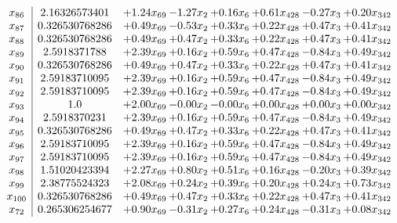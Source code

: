 \documentclass[8pt]{article}
\begin{document}
\[\begin{array}{c| c c@{\hskip 2pt} c@{\hskip 2pt} c@{\hskip 2pt} c@{\hskip 2pt} c@{\hskip 2pt} c@{\hskip 2pt} }
 x_{86}   &  2.16326573401 & +  1.24 x_{69} & -1.27 x_{2} & +  0.16 x_{6} & +  0.61 x_{428} & -0.27 x_{3} & +  0.20 x_{342}\\
 x_{87}   &  0.326530768286 & +  0.49 x_{69} & -0.53 x_{2} & +  0.33 x_{6} & +  0.22 x_{428} & +  0.47 x_{3} & +  0.41 x_{342}\\
 x_{88}   &  0.326530768286 & +  0.49 x_{69} & +  0.47 x_{2} & +  0.33 x_{6} & +  0.22 x_{428} & +  0.47 x_{3} & +  0.41 x_{342}\\
 x_{89}   &  2.5918371788 & +  2.39 x_{69} & +  0.16 x_{2} & +  0.59 x_{6} & +  0.47 x_{428} & -0.84 x_{3} & +  0.49 x_{342}\\
 x_{90}   &  0.326530768286 & +  0.49 x_{69} & +  0.47 x_{2} & +  0.33 x_{6} & +  0.22 x_{428} & +  0.47 x_{3} & +  0.41 x_{342}\\
 x_{91}   &  2.59183710095 & +  2.39 x_{69} & +  0.16 x_{2} & +  0.59 x_{6} & +  0.47 x_{428} & -0.84 x_{3} & +  0.49 x_{342}\\
 x_{92}   &  2.59183710095 & +  2.39 x_{69} & +  0.16 x_{2} & +  0.59 x_{6} & +  0.47 x_{428} & -0.84 x_{3} & +  0.49 x_{342}\\
 x_{93}   &  1.0 & +  2.00 x_{69} & -0.00 x_{2} & -0.00 x_{6} & +  0.00 x_{428} & +  0.00 x_{3} & +  0.00 x_{342}\\
 x_{94}   &  2.5918370231 & +  2.39 x_{69} & +  0.16 x_{2} & +  0.59 x_{6} & +  0.47 x_{428} & -0.84 x_{3} & +  0.49 x_{342}\\
 x_{95}   &  0.326530768286 & +  0.49 x_{69} & +  0.47 x_{2} & +  0.33 x_{6} & +  0.22 x_{428} & +  0.47 x_{3} & +  0.41 x_{342}\\
 x_{96}   &  2.59183710095 & +  2.39 x_{69} & +  0.16 x_{2} & +  0.59 x_{6} & +  0.47 x_{428} & -0.84 x_{3} & +  0.49 x_{342}\\
 x_{97}   &  2.59183710095 & +  2.39 x_{69} & +  0.16 x_{2} & +  0.59 x_{6} & +  0.47 x_{428} & -0.84 x_{3} & +  0.49 x_{342}\\
 x_{98}   &  1.51020423394 & +  2.27 x_{69} & +  0.80 x_{2} & +  0.51 x_{6} & +  0.16 x_{428} & -0.20 x_{3} & +  0.39 x_{342}\\
 x_{99}   &  2.38775524323 & +  2.08 x_{69} & +  0.24 x_{2} & +  0.39 x_{6} & +  0.20 x_{428} & +  0.24 x_{3} & +  0.73 x_{342}\\
 x_{100}   &  0.326530768286 & +  0.49 x_{69} & +  0.47 x_{2} & +  0.33 x_{6} & +  0.22 x_{428} & +  0.47 x_{3} & +  0.41 x_{342}\\
 x_{72}   &  0.265306254677 & +  0.90 x_{69} & -0.31 x_{2} & +  0.27 x_{6} & +  0.24 x_{428} & -0.31 x_{3} & +  0.08 x_{342}\\

\end{array}\]
\end{document}
